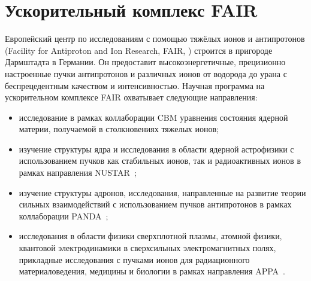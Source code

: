 \section{Ускорительный комплекс FAIR}\label{sec:secFAIR}




Европейский центр по исследованиям с помощью тяжёлых ионов и антипротонов (Facility for Antiproton and Ion Research, FAIR, \cite{FAIR}) строится в пригороде Дармштадта в Германии.
Он предоставит высокоэнергетичные, прецизионно настроенные пучки антипротонов и различных ионов от водорода до урана с беспрецедентным качеством и интенсивностью.
Научная программа на ускорительном комплексе FAIR охватывает следующие направления:
\begin{itemize}
\item исследование в рамках коллаборации CBM уравнения состояния ядерной материи, получаемой в столкновениях тяжелых ионов;
\item изучение структуры ядра и исследования в области ядерной астрофизики с использованием пучков как стабильных ионов, так и радиоактивных ионов в рамках направления NUSTAR~\cite{NUSTAR};
\item изучение структуры адронов, исследования, направленные на развитие теории сильных взаимодействий с использованием пучков антипротонов в рамках коллаборации PANDA~\cite{PANDA};
\item исследования в области физики сверхплотной плазмы, атомной физики, квантовой электродинамики в сверхсильных электромагнитных полях, прикладные исследования с пучками ионов для радиационного материаловедения, медицины и биологии в рамках направления APPA~\cite{APPA}.
\end{itemize}


